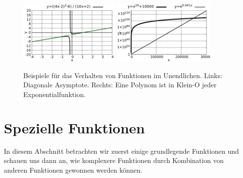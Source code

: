 \begin{figure}
    \centering
    \includegraphics[width=0.45\textwidth]{./gnuplot/diagonal-asymptote}
    \includegraphics[width=0.45\textwidth]{./gnuplot/example-little-o}
    \caption{Beispiele für das Verhalten von Funktionen im Unendlichen. Links: Diagonale Asymptote. Rechts: Eine Polynom ist in Klein-O jeder Exponentialfunktion.}
    \label{fig:BehLargeValFun}
\end{figure}

\section{Spezielle Funktionen}

In diesem Abschnitt betrachten wir zuerst einige grundlegende Funktionen und schauen uns dann an, wie komplexere Funktionen durch Kombination von anderen Funktionen gewonnen werden können.

